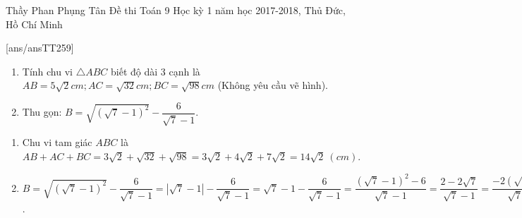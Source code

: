 \begin{name}
{Thầy Phan Phụng Tân}
{Đề thi Toán 9 Học kỳ 1 năm học 2017-2018, Thủ Đức, Hồ Chí Minh }
\end{name}
\setcounter{ex}{0}
[ans/ansTT259]
\begin{ex}%
\begin{enumerate}
	\item Tính chu vi $\triangle ABC$ biết độ dài 3 cạnh là $AB = 5\sqrt{2} cm; AC = \sqrt{32}cm; BC = \sqrt{98}cm$ (Không yêu cầu vẽ hình).
	\item  Thu gọn: $B = \sqrt{(\sqrt{7}-1)^2} - \dfrac{6}{\sqrt{7}-1}$.
\end{enumerate}
	\loigiai
		{
			\begin{enumerate}
				\item Chu vi tam giác $ABC$ là $AB + AC + BC = 3\sqrt{2}+\sqrt{32}+\sqrt{98}=3\sqrt{2}+4\sqrt{2}+7\sqrt{2}=14\sqrt{2}~(cm)$.
				\item  $B  = \sqrt{(\sqrt{7}-1)^2} - \dfrac{6}{\sqrt{7}-1} = \left|\sqrt{7}-1 \right| - \dfrac{6}{\sqrt{7}-1}=\sqrt{7}-1-\dfrac{6}{\sqrt{7}-1} = \dfrac{(\sqrt{7}-1)^2 - 6}{\sqrt{7}-1} = \dfrac{2-2\sqrt{7}}{\sqrt{7}-1}=\dfrac{-2(\sqrt{7}-1)}{\sqrt{7}-1} = -2$.
			\end{enumerate}
		}
\end{ex}


